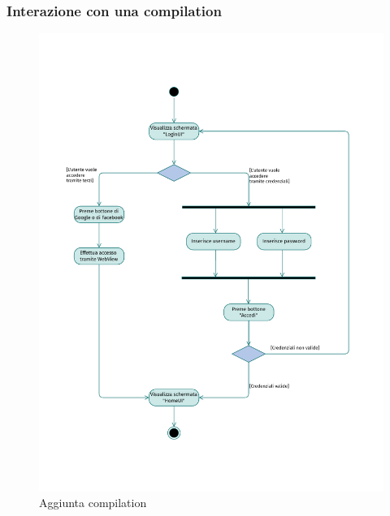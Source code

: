 \documentclass{natourDoc}
\begin{document}
\subsubsection{Interazione con una compilation}
\begin{figure}[!htbp]
	\centering
	\includegraphics[width=\textwidth, page=7]{./diagrams/activity.pdf}
	\caption{Aggiunta compilation}
\end{figure}
\FloatBarrier
\end{document}
